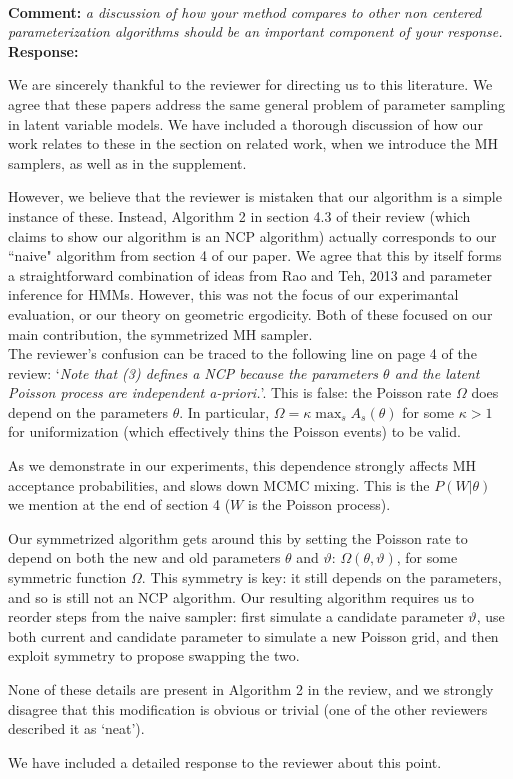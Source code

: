 \documentclass[11pt]{article}
\newcommand{\rev}[1]{\textbf{Comment: }\emph{#1}}
\newcommand{\resp}{\textbf{Response: }}
\begin{document}
~\\
\rev{a discussion of how your method compares to other non centered parameterization algorithms should be an important component of your response.} \\ 
\resp{We are sincerely thankful to the reviewer for directing us to this literature. 
  We agree that these papers address the same general problem of parameter sampling in latent variable models. 
We have included a thorough discussion of how our work relates to these in the section on related work, when we introduce the MH samplers, as well as in the supplement. 

However, we believe that the reviewer is mistaken that our algorithm is a simple instance of these. 
Instead, Algorithm 2 in section 4.3 of their review (which claims to show our algorithm is an NCP algorithm) actually corresponds to our ``naive" algorithm from section 4 of our paper. 
We agree that this by itself forms a straightforward combination of ideas from Rao and Teh, 2013 and parameter inference for HMMs. However, this was not the focus of our experimantal evaluation, or our theory on geometric ergodicity. Both of these focused on our main contribution, the symmetrized MH sampler. 
~\\

The reviewer's confusion can be traced to the following line on page 4 of the review: `{\em Note that (3) defines a NCP because the parameters $\theta$ and the latent Poisson process are independent a-priori.}'. 
This is false: the Poisson rate $\Omega$ does depend on the parameters $\theta$. In particular, $\Omega = \kappa \max_s A_s(\theta)$ for some $\kappa > 1$ for uniformization (which effectively thins the Poisson events) to be valid. 

As we demonstrate in our experiments, this dependence strongly affects MH acceptance probabilities, and slows down MCMC mixing. 
This is the $P(W|\theta)$ we mention at the end of section 4 ($W$ is the Poisson process).

Our symmetrized algorithm gets around this by setting the Poisson rate to depend on both the new and old parameters $\theta$ and $\vartheta$: $\Omega(\theta,\vartheta)$, for some symmetric function $\Omega$. This symmetry is key: it still depends on the parameters, and so is still not an NCP algorithm. Our resulting algorithm requires us to reorder steps from the naive sampler: first simulate a candidate parameter $\vartheta$, use both current and candidate parameter to simulate a new Poisson grid, and then exploit symmetry to propose swapping the two.

None of these details are present in Algorithm 2 in the review, and we strongly disagree that this modification is obvious or trivial (one of the other reviewers described it as `neat').

We have included a detailed response to the reviewer about this point.

}
\end{document}

